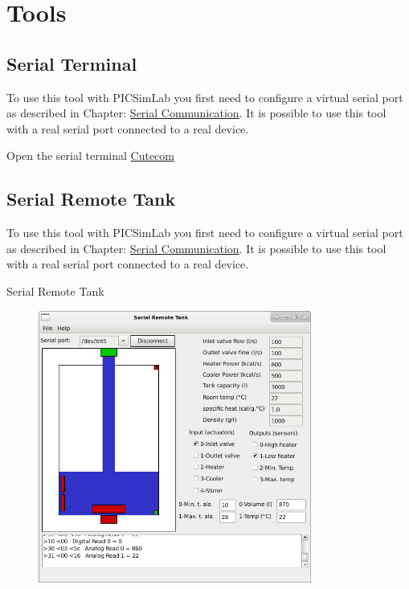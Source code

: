 \chapter{Tools}


\section{Serial Terminal} \hypertarget{def:sterm}{}

To use this tool with PICSimLab you first need to configure a virtual serial port as described in Chapter: \hyperlink{def:seriali}{Serial Communication}.
It is possible to use this tool with a real serial port connected to a real device. 

Open the serial terminal  \href{https://github.com/neundorf/CuteCom}{Cutecom}


\section {Serial Remote Tank} \hypertarget{def:srtank}{}

To use this tool with PICSimLab you first need to configure a virtual serial port as described in Chapter: \hyperlink{def:seriali}{Serial Communication}.
It is possible to use this tool with a real serial port connected to a real device. 

Serial Remote Tank

\begin{figure}[H]
\center
\includegraphics[width=0.8\textwidth]{img/srtank.png} 
\end{figure} 


